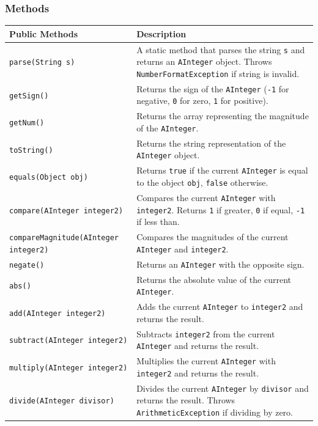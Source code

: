 \documentclass[a4paper,12pt]{article}
\begin{document}
\subsubsection{Methods}

\begin{center}
\begin{tabular}{|l|p{8cm}|}
\hline
\textbf{Public Methods} & \textbf{Description} \\
\hline
\texttt{parse(String s)} & A static method that parses the string \texttt{s} and returns an \texttt{AInteger} object. Throws \texttt{NumberFormatException} if string is invalid.\\
\hline
\texttt{getSign()} & Returns the sign of the \texttt{AInteger} (\texttt{-1} for negative, \texttt{0} for zero, \texttt{1} for positive). \\
\hline
\texttt{getNum()} & Returns the array representing the magnitude of the \texttt{AInteger}. \\
\hline
\texttt{toString()} & Returns the string representation of the \texttt{AInteger} object. \\
\hline
\texttt{equals(Object obj)} & Returns \texttt{true} if the current \texttt{AInteger} is equal to the object \texttt{obj}, \texttt{false} otherwise. \\
\hline
\texttt{compare(AInteger integer2)} & Compares the current \texttt{AInteger} with \texttt{integer2}. Returns \texttt{1} if greater, \texttt{0} if equal, \texttt{-1} if less than. \\
\hline
\texttt{compareMagnitude(AInteger integer2)} & Compares the magnitudes of the current \texttt{AInteger} and \texttt{integer2}. \\
\hline
\texttt{negate()} & Returns an \texttt{AInteger} with the opposite sign. \\
\hline
\texttt{abs()} & Returns the absolute value of the current \texttt{AInteger}. \\
\hline
\texttt{add(AInteger integer2)} & Adds the current \texttt{AInteger} to \texttt{integer2} and returns the result. \\
\hline
\texttt{subtract(AInteger integer2)} & Subtracts \texttt{integer2} from the current \texttt{AInteger} and returns the result. \\
\hline
\texttt{multiply(AInteger integer2)} & Multiplies the current \texttt{AInteger} with \texttt{integer2} and returns the result. \\
\hline
\texttt{divide(AInteger divisor)} & Divides the current \texttt{AInteger} by \texttt{divisor} and returns the result. Throws \texttt{ArithmeticException} if dividing by zero. \\
\hline
\end{tabular}
\end{center}
\end{document}
